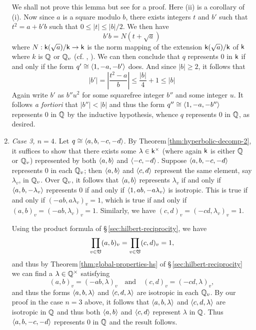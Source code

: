 \begin{enumerate}[wide, nosep, label=(\alph*)]
    We shall not prove this lemma but see \cite[p.~42]{serre2012course} for a proof. Here (ii) is a corollary of (i). Now since \(a\) is a square modulo \(b\), there exists integers \(t\) and \(b'\) such that \(t^2 = a + b'b\) such that \(0 \leq |t| \leq |b|/2\). We then have
    \[ b'b = N(t + \sqrt{a})\]
    where \(N: \mathsf{k}(\sqrt{a})/\mathsf{k} \to \mathsf{k}\) is the norm mapping of the extension \(\mathsf{k}(\sqrt{a})/\mathsf{k}\) of \(\mathsf{k}\) where \(k\) is \(\mathbb{Q}\) or \(\mathbb{Q}_v\) (cf. \cite[p.940]{rotman2010advanced}, \cite[p.~289]{hungerford2012algebra}). We can then conclude that \(q\) represents \(0\) in \(\mathsf{k}\) if and only if the form \(q' \cong \langle 1, -a, -b' \rangle\) does. And since \(|b| \geq 2\), it follows that
    \[
        |b'| = \left|\frac{t^2-a}{b}\right| \leq \frac{|b|}{4} + 1 \leq |b|
    \]
    Again write \(b'\) as \(b''u^2\) for some squarefree integer \(b''\) and some integer \(u\). It follows \emph{a fortiori} that \(|b''| < |b|\) and thus the form \(q'' \cong \langle 1, -a, -b'' \rangle\) represents \(0\) in \(\mathbb{Q}\) by the inductive hypothesis, whence \(q\) represents \(0\) in \(\mathbb{Q}\), as desired.

    \item \emph{Case 3, \(n = 4\).} Let \(q \cong \langle a, b, -c, -d \rangle\). By Theorem\,\ref{thm:hyperbolic-decomp-2}, it suffices to show that there exists some \(\lambda \in \mathsf{k}^{\times}\) (where again \(\mathsf{k}\) is either \(\mathbb{Q}\) or \(\mathbb{Q}_v\)) represented by both \(\langle a, b \rangle\) and \(\langle -c, -d \rangle\). Suppose \(\langle a, b, -c, -d \rangle\) represents \(0\) in each \(\mathbb{Q}_v\); then \(\langle a, b \rangle\) and \(\langle c, d \rangle\) represent the same element, say \(\lambda_v\), in \(\mathbb{Q}_v\). Over \(\mathbb{Q}_v\), it follows that \(\langle a, b \rangle\) represents \(\lambda_v\) if and only if \(\langle a, b, -\lambda_v \rangle\) represents \(0\) if and only if \(\langle 1, ab, -a\lambda_v \rangle\) is isotropic. This is true if and only if \((-ab, a\lambda_v)_v = 1\), which is true if and only if \((a, b)_v = (-ab, \lambda_v)_v = 1\). Similarly, we have \((c,d)_v = (-cd, \lambda_v)_v = 1\).
    
    Using the product formula of \S\,\ref{sec:hilbert-reciprocity}, we have 
    \[
        \prod_{v \in \mathfrak{V}} (a, b)_v = \prod_{v \in \mathfrak{V}} (c, d)_v = 1,
    \]
    and thus by Theorem\,\ref{thm:global-properties-hs} of \S\,\ref{sec:hilbert-reciprocity} we can find a \(\lambda \in \mathbb{Q}^{\times}\) satisfying
    \[
        (a, b)_v = (-ab, \lambda)_v \quad \text{and} \quad (c, d)_v = (-cd, \lambda)_v,
    \]
    and thus the forms \(\langle a, b, \lambda \rangle\) and \(\langle c, d, \lambda \rangle\) are isotropic in each \(\mathbb{Q}_v\). By our proof in the case \(n = 3\) above, it follows that \(\langle a, b, \lambda \rangle\) and \(\langle c, d, \lambda \rangle\) are isotropic in \(\mathbb{Q}\) and thus both \(\langle a,b \rangle\) and \(\langle c,d \rangle\) represent \(\lambda\) in \(\mathbb{Q}\). Thus \(\langle a, b, -c, -d \rangle\) represents \(0\) in \(\mathbb{Q}\) and the result follows.
    

\end{enumerate}
